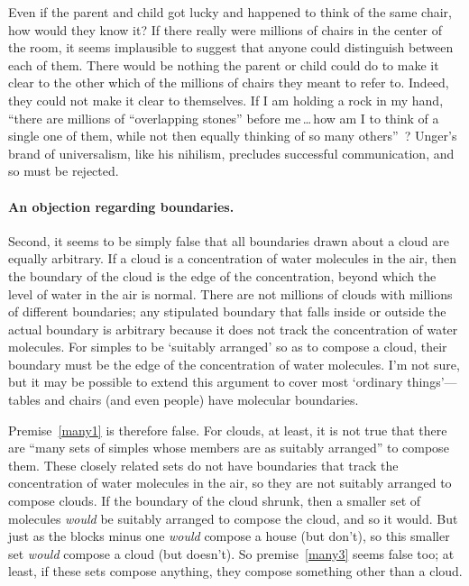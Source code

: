 \documentclass[11pt]{article}
\begin{document}
\begin{spacing}{1.5}
Even if the parent and child got lucky and happened to think of the same chair, how would they know it? If there really were millions of chairs in the center of the room, it seems implausible to suggest that anyone could distinguish between each of them.  There would be nothing the parent or child could do to make it clear to the other which of the millions of chairs they meant to refer to.  Indeed, they could not make it clear to themselves.  If I am holding a rock in my hand, ``there are millions of ``overlapping stones'' before me\,\ldots\,how am I to think of a single one of them, while not then equally thinking of so many others''~\citep[456]{unger1980a}? Unger's brand of universalism, like his nihilism, precludes successful communication, and so must be rejected.

\paragraph{An objection regarding boundaries.}
Second, it seems to be simply false that all boundaries drawn about a cloud are equally arbitrary.  If a cloud is a concentration of water molecules in the air, then the boundary of the cloud is the edge of the concentration, beyond which the level of water in the air is normal.  There are not millions of clouds with millions of different boundaries; any stipulated boundary that falls inside or outside the actual boundary is arbitrary because it does not track the concentration of water molecules.  For simples to be `suitably arranged' so as to compose a cloud, their boundary must be the edge of the concentration of water molecules.  I'm not sure, but it may be possible to extend this argument to cover most `ordinary things'---tables and chairs (and even people) have molecular boundaries.

Premise~\ref{many1} is therefore false.  For clouds, at least, it is not true that there are ``many sets of simples whose members are as suitably arranged'' to compose them.  These closely related sets do not have boundaries that track the concentration of water molecules in the air, so they are not suitably arranged to compose clouds.  If the boundary of the cloud shrunk, then a smaller set of molecules {\em would} be suitably arranged to compose the cloud, and so it would.  But just as the blocks minus one {\em would} compose a house (but don't), so this smaller set {\em would} compose a cloud (but doesn't).  So premise~\ref{many3} seems false too; at least, if these sets compose anything, they compose something other than a cloud.


\end{spacing}
\end{document}
